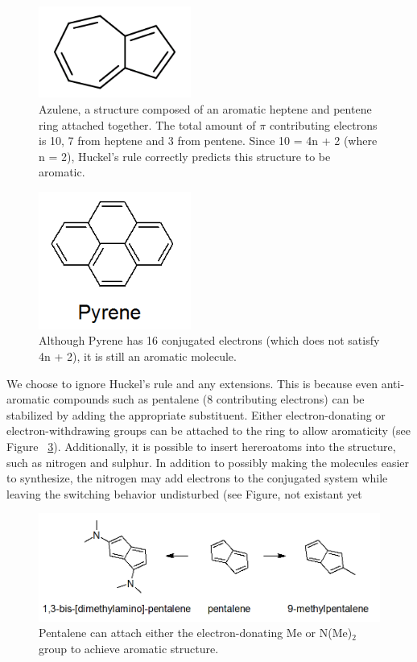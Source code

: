 \documentclass[12pt]{article}
\begin{document}
\begin{figure}[ht!]
\centering
\includegraphics[width=50mm]{azulene.png}
\caption{Azulene, a structure composed of an aromatic heptene and pentene ring attached together. The total amount of $\pi$ contributing electrons is 10, 7 from heptene and 3 from pentene. Since 10 = 4n + 2 (where n = 2), Huckel's rule correctly predicts this structure to be aromatic.}
\label{fig:azulene}
\end{figure}

\begin{figure}[ht!]
\centering
\includegraphics[width=50mm]{pyrene.png}
\caption{Although Pyrene has 16 conjugated electrons (which does not satisfy 4n + 2), it is still an aromatic molecule.}
\label{fig:pyrene}
\end{figure}



We choose to ignore Huckel's rule and any extensions. This is because even anti-aromatic compounds such as pentalene (8 contributing electrons) can be stabilized by adding the appropriate substituent. Either electron-donating or electron-withdrawing groups can be attached to the ring to allow aromaticity (see Figure ~\ref{fig:pentalene}). Additionally, it is possible to insert hereroatoms into the structure, such as nitrogen and sulphur. In addition to possibly making the molecules easier to synthesize, the nitrogen may add electrons to the conjugated system while leaving the switching behavior undisturbed \cite{v06} (see Figure, not existant yet%

\begin{figure}[ht!]
\centering
\includegraphics[width=160mm]{pentalene.png}
\caption{Pentalene can attach either the electron-donating Me \cite{methylPentalene} or N(Me)$_2$ \cite{nitrogenPentalene} group to achieve aromatic structure.}
\label{fig:pentalene}
\end{figure}
\end{document}
